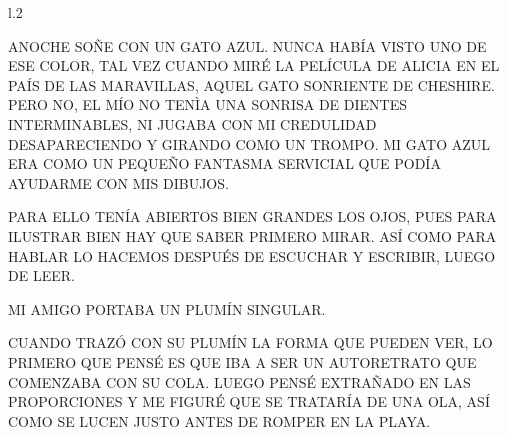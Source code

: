 %


\iffalse
\newpage
{}
\begin{wrapfigure} [7]{l}{.2\textwidth}\vspace{-1.2cm}\hspace{-1.5cm}
	
	\end{wrapfigure}	
ANOCHE SOÑE CON UN GATO AZUL. NUNCA HABÍA VISTO UNO DE ESE COLOR, TAL VEZ CUANDO MIRÉ LA PELÍCULA DE ALICIA EN EL PAÍS DE LAS MARAVILLAS, AQUEL GATO SONRIENTE DE CHESHIRE. PERO NO, EL MÍO NO TENÌA UNA SONRISA DE DIENTES INTERMINABLES, NI JUGABA CON MI CREDULIDAD DESAPARECIENDO Y GIRANDO COMO UN TROMPO. MI GATO AZUL ERA COMO UN PEQUEÑO FANTASMA SERVICIAL QUE PODÍA AYUDARME CON MIS DIBUJOS.

PARA ELLO TENÍA ABIERTOS BIEN GRANDES LOS OJOS, PUES PARA ILUSTRAR BIEN HAY QUE SABER PRIMERO MIRAR. ASÍ COMO PARA HABLAR LO HACEMOS DESPUÉS DE ESCUCHAR Y ESCRIBIR, LUEGO DE LEER. 

MI AMIGO PORTABA UN PLUMÍN SINGULAR.
\newpage
{}

CUANDO TRAZÓ CON SU PLUMÍN LA FORMA QUE PUEDEN VER, LO PRIMERO QUE PENSÉ ES QUE IBA A SER UN AUTORETRATO QUE COMENZABA CON SU COLA. LUEGO PENSÉ EXTRAÑADO EN LAS PROPORCIONES Y ME FIGURÉ QUE SE TRATARÍA DE UNA OLA, ASÍ COMO SE LUCEN JUSTO ANTES DE ROMPER EN LA PLAYA.


